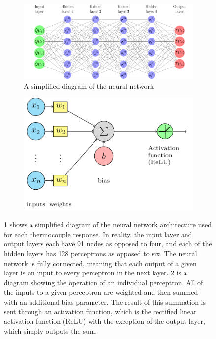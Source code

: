 \documentclass{article}
\begin{document}
\begin{figure}[htbp]
  \centering
  \begin{subfigure}[t]{.6\textwidth}
      \centering
      \includegraphics[width=\textwidth,keepaspectratio]{figures/neural_network_diagram.pdf}
      \caption{A simplified diagram of the neural network   }
      \label{fig:neural_network_diagram}
  \end{subfigure}
  \begin{subfigure}[t]{.35\textwidth}
      \centering
      \includegraphics[width=\textwidth ,keepaspectratio]{figures/perceptron_diagram.pdf}
      \caption{}
      \label{fig:perceptron_diagram}
  \end{subfigure}
  \caption{\protect\ref{fig:neural_network_diagram} shows a simplified diagram of the neural network architecture used for each thermocouple response. In reality, the input layer and output layers each have 91 nodes as opposed to four, and each of the hidden layers has 128 perceptrons as opposed to six. The neural network is fully connected, meaning that each output of a given layer is an input to every perceptron in the next layer. \protect\ref{fig:perceptron_diagram} is a diagram showing the operation of an individual perceptron. All of the inputs to a given perceptron are weighted and then summed with an additional bias parameter. The result of this summation is sent through an activation function, which is the rectified linear activation function (ReLU) with the exception of the output layer, which simply outputs the sum.} 
  \label{fig:neural_network_drawings}
\end{figure}
\end{document}
